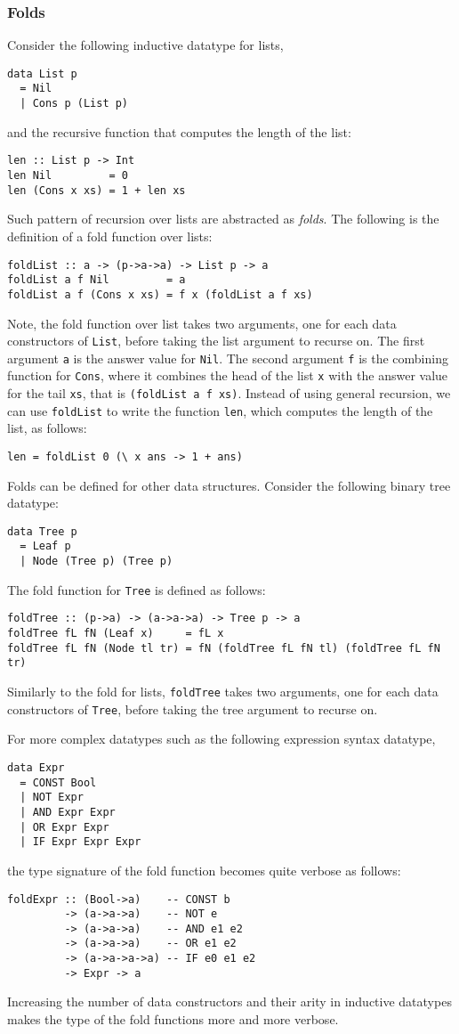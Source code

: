 \documentclass[letterpaper,12pt]{article}
\begin{document}
\subsubsection{Folds}
Consider the following inductive datatype for lists,
\begin{verbatim}
data List p
  = Nil
  | Cons p (List p)
\end{verbatim}
and the recursive function that computes the length of the list:
\begin{verbatim}
len :: List p -> Int
len Nil         = 0
len (Cons x xs) = 1 + len xs
\end{verbatim}
Such pattern of recursion over lists are abstracted as \emph{folds}.
The following is the definition of a fold function over lists:
\begin{verbatim}
foldList :: a -> (p->a->a) -> List p -> a
foldList a f Nil         = a
foldList a f (Cons x xs) = f x (foldList a f xs)
\end{verbatim}
Note, the fold function over list takes two arguments,
one for each data constructors of \verb|List|,
before taking the list argument to recurse on.
The first argument \verb|a| is the answer value for \verb|Nil|.
The second argument \verb|f| is the combining function for \verb|Cons|,
where it combines the head of the list \verb|x| with the answer value
for the tail \verb|xs|, that is \verb|(foldList a f xs)|.
Instead of using general recursion, we can use \verb|foldList| to write
the function \verb|len|, which computes the length of the list, as follows:
\begin{verbatim}
len = foldList 0 (\ x ans -> 1 + ans)
\end{verbatim}

Folds can be defined for other data structures.
Consider the following binary tree datatype:
\begin{verbatim}
data Tree p
  = Leaf p
  | Node (Tree p) (Tree p)
\end{verbatim}
The fold function for \verb|Tree| is defined as follows:
\begin{verbatim}
foldTree :: (p->a) -> (a->a->a) -> Tree p -> a
foldTree fL fN (Leaf x)     = fL x
foldTree fL fN (Node tl tr) = fN (foldTree fL fN tl) (foldTree fL fN tr)
\end{verbatim}
Similarly to the fold for lists, \verb|foldTree|
takes two arguments, one for each data constructors of \verb|Tree|,
before taking the tree argument to recurse on.

For more complex datatypes such as the following expression syntax datatype,
\begin{verbatim}
data Expr
  = CONST Bool
  | NOT Expr
  | AND Expr Expr
  | OR Expr Expr
  | IF Expr Expr Expr
\end{verbatim}
the type signature of the fold function becomes quite verbose as follows:
\begin{verbatim}
foldExpr :: (Bool->a)    -- CONST b
         -> (a->a->a)    -- NOT e
         -> (a->a->a)    -- AND e1 e2
         -> (a->a->a)    -- OR e1 e2
         -> (a->a->a->a) -- IF e0 e1 e2
         -> Expr -> a
\end{verbatim}
Increasing the number of data constructors and their arity in inductive
datatypes makes the type of the fold functions more and more verbose.
\end{document}
